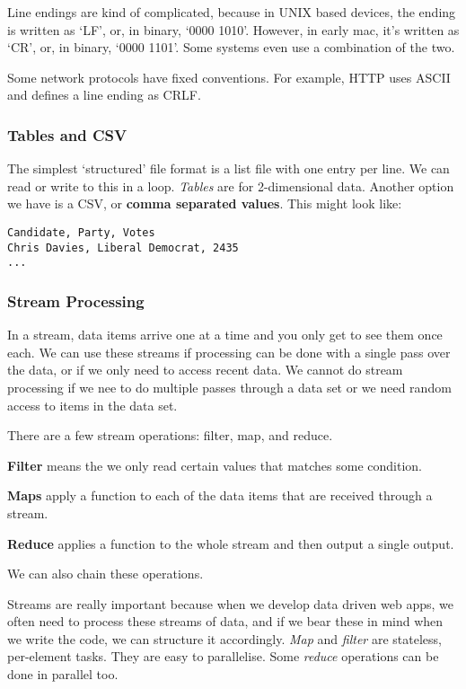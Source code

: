 \documentclass[11pt,a4paper,titlepage,dvipsnames,cmyk]{scrartcl}
\begin{document}
Line endings are kind of complicated, because in UNIX based devices, the
ending is written as `LF', or, in binary, `0000 1010'. However, in early
mac, it's written as `CR', or, in binary, `0000 1101'. Some systems even
use a combination of the two.

Some network protocols have fixed conventions. For example, HTTP
uses ASCII and defines a line ending as CRLF.

\subsubsection{Tables and CSV}%
\label{ssub:tables}
The simplest `structured' file format is a list file with one entry per
line. We can read or write to this in a loop. \textit{Tables} are for
2-dimensional data. Another option we have is a CSV, or \textbf{comma
separated values}. This might look like:

\begin{lstlisting}[style=A]
Candidate, Party, Votes
Chris Davies, Liberal Democrat, 2435
...
\end{lstlisting}

\subsubsection{Stream Processing}%
\label{ssub:stream}
In a stream, data items arrive one at a time and you only get to see them
once each. We can use these streams if processing can be done with a
single pass over the data, or if we only need to access recent data. We
cannot do stream processing if we nee to do multiple passes through a data
set or we need random access to items in the data set.

There are a few stream operations: filter, map, and reduce.

\textbf{Filter} means the we only read certain values that matches some
condition.

\textbf{Maps} apply a function to each of the data items that are received
through a stream.

\textbf{Reduce} applies a function to the whole stream and then output a
single output.

We can also chain these operations.

Streams are really important because when we develop data driven web apps,
we often need to process these streams of data, and if we bear these in
mind when we write the code, we can structure it accordingly. \textit{Map}
and \textit{filter} are stateless, per-element tasks. They are easy to
parallelise. Some \textit{reduce} operations can be done in parallel too. 
\end{document}
